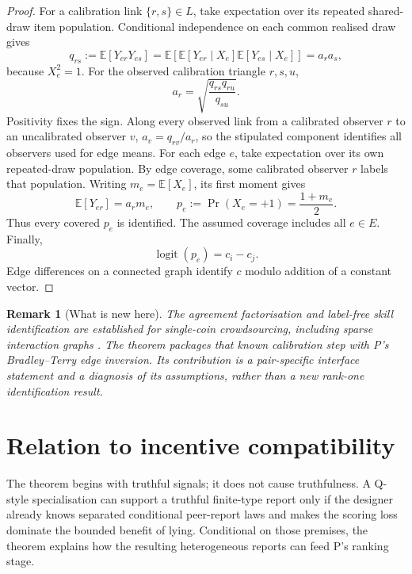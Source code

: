 \documentclass{article}
\newtheorem{remark}{Remark}
\DeclareMathOperator{\logit}{logit}
\begin{document}
\begin{proof}
For a calibration link $\{r,s\}\in L$, take expectation over its repeated shared-draw item population.  Conditional independence on each common realised draw gives
\[
q_{rs}:=\mathbb{E}[Y_{er}Y_{es}]
=\mathbb{E}\!\left[
  \mathbb{E}[Y_{er}\mid X_e]
  \mathbb{E}[Y_{es}\mid X_e]
\right]
=a_ra_s,
\]
because $X_e^2=1$. %
For the observed calibration triangle $r,s,u$,
\[
a_r=\sqrt{\frac{q_{rs}q_{ru}}{q_{su}}}.
\]
Positivity fixes the sign.  Along every observed link from a calibrated observer $r$ to an uncalibrated observer $v$, $a_v=q_{rv}/a_r$, so the stipulated component identifies all observers used for edge means. %
For each edge $e$, take expectation over its own repeated-draw population.  By edge coverage, some calibrated observer $r$ labels that population.  Writing $m_e=\mathbb{E}[X_e]$, its first moment gives
\[
\mathbb{E}[Y_{er}]=a_rm_e,
\qquad p_e:=\Pr(X_e=+1)=\frac{1+m_e}{2}.
\]
Thus every covered $p_e$ is identified.  The assumed coverage includes all $e\in E$.  Finally,
\[
\logit(p_e)=c_i-c_j.
\]
Edge differences on a connected graph identify $c$ modulo addition of a constant vector. %
\end{proof}

\begin{remark}[What is new here]
The agreement factorisation and label-free skill identification are established for single-coin crowdsourcing, including sparse interaction graphs \cite{ma2017crowdsourcing,ma2019gradient}.  The theorem packages that known calibration step with P's Bradley--Terry edge inversion.  Its contribution is a pair-specific interface statement and a diagnosis of its assumptions, rather than a new rank-one identification result. %
\end{remark}

\section{Relation to incentive compatibility}

The theorem begins with truthful signals; it does not cause truthfulness.  A Q-style specialisation can support a truthful finite-type report only if the designer already knows separated conditional peer-report laws and makes the scoring loss dominate the bounded benefit of lying. %
Conditional on those premises, the theorem explains how the resulting heterogeneous reports can feed P's ranking stage. %
\end{document}
